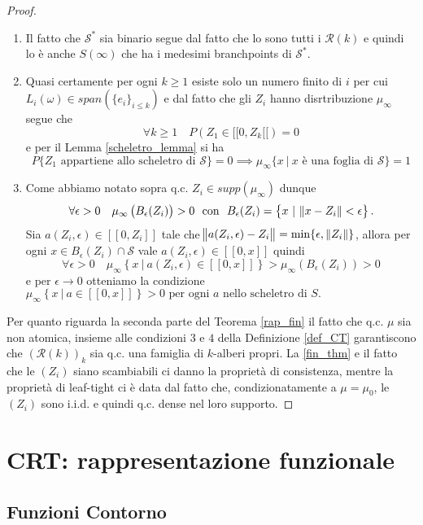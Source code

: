 \documentclass[11pt, twoside]{report}
\newcommand{\Ss}{\mathscr{S}}
\newcommand{\Rr}{\mathscr{R}}
\theoremstyle{definition}
\theoremstyle{plain}
\theoremstyle{remark}
\numberwithin{equation}{chapter}
\begin{document}
\begin{proof}
\begin{enumerate}
\item Il fatto che $\Ss^*$ sia binario segue dal fatto che lo sono tutti i $\Rr(k)$ e quindi lo è anche $S(\infty)$ che ha i medesimi branchpoints di $\Ss^*$.

\item Quasi certamente per ogni $k\geq 1$ esiste solo un numero finito di $i$ per cui $L_i(\omega) \in span(\{e_i\}_{i\leq k})$ e dal fatto che gli $Z_i$ hanno disrtribuzione $\mu_\infty$ segue che
$$\forall k\geq 1 \quad P(Z_1 \in [[0, Z_k[[)=0$$
e per il Lemma \ref{scheletro_lemma} si ha
$$P\{Z_1 \text{ appartiene allo scheletro di }\Ss\}=0 \implies \mu_\infty\{x \ | \ x \text{ è una foglia di }\Ss\}=1$$ 

\item Come abbiamo notato sopra q.c. $Z_i \in supp(\mu_\infty)$ dunque
$$\forall \epsilon>0 \quad \mu_\infty\left(B_\epsilon(Z_i)\right)>0 \ \text{ con } \ B_\epsilon(Z_i)=\left\{x \ | \ \norm{x-Z_i}<\epsilon\right\}.$$
Sia $a(Z_i, \epsilon) \in [[0, Z_i]]$ tale che $\norm{a(Z_i, \epsilon)-Z_i}=\min\{\epsilon, \, \norm{Z_i}\}$, allora per ogni $x\in B_\epsilon(Z_i)\cap \Ss$ vale $a(Z_i,\epsilon) \in [[0,x]]$ quindi
$$\forall \epsilon>0 \quad \mu_\infty\left\{x \ | \ a(Z_i,\epsilon) \in [[0,x]]\right\}>\mu_\infty(B_\epsilon(Z_i))>0$$
e per $\epsilon \rightarrow 0$ otteniamo la condizione $\mu_\infty\left\{x \ | \ a\in [[0,x]]\right\}>0 \text{ per ogni } a \text{ nello scheletro di } S.$
\end{enumerate}

Per quanto riguarda la seconda parte del Teorema \ref{rap_fin} il fatto che q.c. $\mu$ sia non atomica, insieme alle condizioni $3$ e $4$ della Definizione \ref{def_CT} garantiscono che $(\Rr(k))_k$ sia q.c. una famiglia di $k$-alberi propri. La \eqref{fin_thm} e il fatto che le $(Z_i)$ siano scambiabili ci danno la proprietà di consistenza, mentre  la proprietà di leaf-tight ci è data dal fatto che, condizionatamente a $\mu=\mu_0$, le $(Z_i)$ sono i.i.d. e quindi q.c. dense nel loro supporto.

\end{proof}



\chapter{CRT: rappresentazione funzionale}

\section{Funzioni Contorno}
\end{document}
